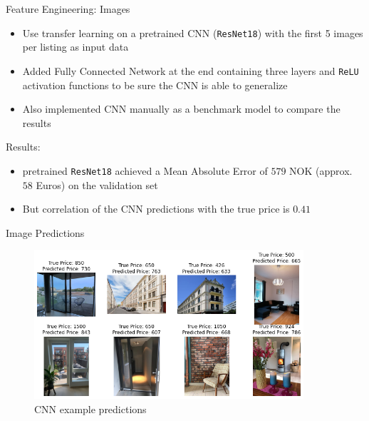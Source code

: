 \documentclass[ngerman,inputenc]{beamer}
\begin{document}
\begin{frame}{Feature Engineering: Images}

  \begin{itemize}
    \item Use transfer learning on a pretrained CNN (\texttt{ResNet18}) with the first 5 images per listing as input data
    \item Added Fully Connected Network at the end containing three layers and \texttt{ReLU} activation functions to be sure the CNN is able to generalize
    \item Also implemented CNN manually as a benchmark model to compare the results
  \end{itemize}

  \pause

  \hspace{5pt}

  Results:
  \begin{itemize}
    \item pretrained \texttt{ResNet18} achieved a Mean Absolute Error of $579$ NOK (approx. $58$ Euros) on the validation set
    \item But correlation of the CNN predictions with the true price is $0.41$
  \end{itemize}

\end{frame}

\begin{frame}{Image Predictions}

  \begin{figure}[H]
    \centering
    \includegraphics[width=10cm]{cnn_examples_medium.png}
    \caption{CNN example predictions}
  \end{figure}

\end{frame}
\end{document}
